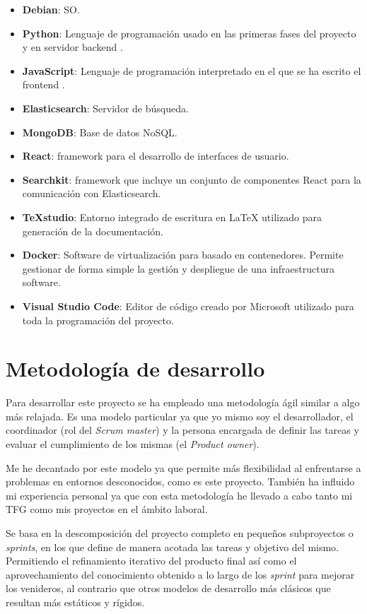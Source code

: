 \begin{itemize}
	\item \textbf{Debian}: \acrfull{SO}.
	\item \textbf{Python}: Lenguaje de programación usado en las primeras fases del proyecto y en servidor \gls{backend} .
	\item \textbf{JavaScript}: Lenguaje de programación interpretado en el que se ha escrito el \gls{frontend} .
	\item \textbf{Elasticsearch}: Servidor de búsqueda.
	\item \textbf{MongoDB}: Base de datos NoSQL.
	\item \textbf{React}:  \Gls{framework} para el desarrollo de interfaces de usuario.
	\item \textbf{Searchkit}: \Gls{framework} que incluye un conjunto de componentes React para la comunicación con Elasticsearch.
	\item \textbf{TeXstudio}: Entorno integrado de escritura en \LaTeX{} utilizado para generación de la documentación.
	\item \textbf{Docker}: Software de virtualización para basado en contenedores. Permite gestionar de forma simple la gestión y despliegue de una infraestructura software.
	\item \textbf{Visual Studio Code}: Editor de código creado por Microsoft utilizado para toda la programación del proyecto.
	
\end{itemize}

\section{Metodología de desarrollo}
\label{sc:metodologia}
Para desarrollar este proyecto se ha empleado una metodología ágil similar a \textit{}  algo más relajada. Es una modelo particular ya que yo mismo soy el desarrollador, el coordinador (rol del \textit{Scrum master}) y la persona encargada de definir las tareas y evaluar el cumplimiento de los mismas (el \textit{Product owner}).

Me he decantado por este modelo ya que permite más flexibilidad al enfrentarse a problemas en entornos desconocidos, como es este proyecto. También ha influido mi experiencia personal ya que con esta metodología he llevado a cabo tanto mi \acrshort{TFG} como mis proyectos en el ámbito laboral. 

Se basa en la descomposición del proyecto completo en pequeños subproyectos o \textit{sprints}, en los que define de manera acotada las tareas y objetivo del mismo. Permitiendo el refinamiento iterativo del producto final así como el aprovechamiento del conocimiento obtenido a lo largo de los \textit{sprint} para mejorar los venideros, al contrario que otros modelos de desarrollo más clásicos que resultan más estáticos y rígidos.

